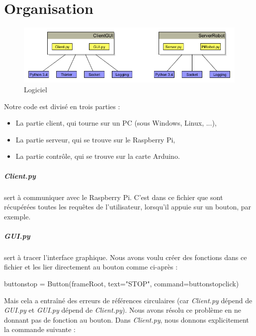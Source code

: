 \documentclass[12pt,a4paper]{report}
\begin{document}
\chapter{Organisation}

\begin{figure}[hf!]
\center
\includegraphics[scale=0.6]{images/GraphLogiciel.png}
\caption{Logiciel}
\end{figure}

Notre code est divisé en trois parties :

\bigbreak

\begin{itemize}
\item La partie client, qui tourne sur un PC (sous Windows, Linux, ...),
\item La partie serveur, qui se trouve sur le Raspberry Pi,
\item La partie contrôle, qui se trouve sur la carte Arduino.
\end{itemize}

\bigbreak

\paragraph{Client.py} sert à communiquer avec le Raspberry Pi. C'est dans ce fichier que sont récupérées toutes les requêtes de l'utilisateur, lorsqu'il appuie sur un bouton, par exemple.

\paragraph{GUI.py} sert à tracer l'interface graphique. Nous avons voulu créer des fonctions dans ce fichier et les lier directement au bouton comme ci-après :

\begin{verbatimtab}[3]
buttonstop = Button(frameRoot, text="STOP", command=buttonstopclick)
\end{verbatimtab}

Mais cela a entraîné des erreurs de références circulaires (car \textit{Client.py} dépend de \textit{GUI.py} et \textit{GUI.py} dépend de \textit{Client.py}). Nous avons résolu ce problème en ne donnant pas de fonction au bouton. Dans \textit{Client.py}, nous donnons explicitement la commande suivante :
\end{document}
